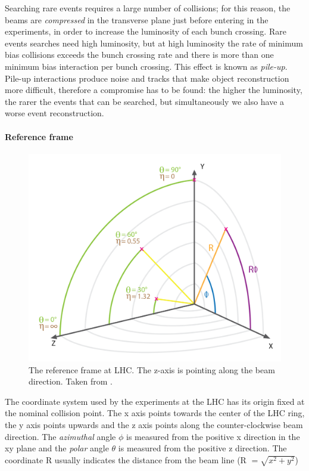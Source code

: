 Searching rare events requires a large number of collisions; for this reason, the
beams are \emph{compressed} in the transverse plane just before entering in the experiments, in order to increase the luminosity of each bunch crossing. Rare events searches need high luminosity, but at high luminosity the rate
of minimum bias collisions exceeds the
bunch crossing rate and there is more
than one minimum bias interaction per
bunch crossing. This effect is known
as \emph{pile-up}. Pile-up interactions produce noise and tracks that make object
reconstruction more difficult, therefore
a compromise has to be found: the higher
the luminosity, the rarer the events that can
be searched, but simultaneously we also have a worse event reconstruction.

\paragraph{Reference frame}

\begin{figure}
    \centering
    \includegraphics[width=\columnwidth]{gfx/ch1/img_cms_coordinates.png}
    \caption[Reference frame]{The reference frame at LHC. The z-axis is pointing along the beam direction. Taken from \cite{Lenzi:1551944}.}
    \label{fig:reff}
\end{figure}

The coordinate system used by the experiments at the LHC has its origin fixed at the nominal collision point. The x axis points towards the center of the LHC ring, the y axis points
upwards and the z axis points along the counter-clockwise beam direction. The \emph{azimuthal}
angle $\phi$ is measured from the positive x direction in the xy plane and the \emph{polar} angle $\theta$ is
measured from the positive z direction. The coordinate R usually indicates the distance from
the beam line (R $= \sqrt{x^2 + y^2}$)

